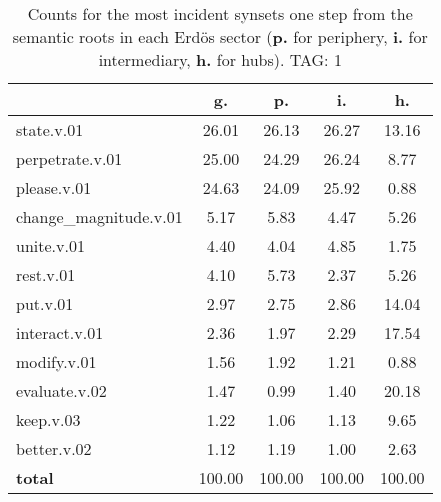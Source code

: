 \begin{table}[h!]
\begin{center}
\begin{tabular}{| l || c | c | c | c |}\hline
 & {\bf g.} & {\bf p.} & {\bf i.} & {\bf h.} \\\hline\hline
state.v.01 & 26.01  & 26.13  & 26.27  & 13.16 \\\hline
perpetrate.v.01 & 25.00  & 24.29  & 26.24  & 8.77 \\\hline
please.v.01 & 24.63  & 24.09  & 25.92  & 0.88 \\\hline
change\_magnitude.v.01 & 5.17  & 5.83  & 4.47  & 5.26 \\\hline
unite.v.01 & 4.40  & 4.04  & 4.85  & 1.75 \\\hline
rest.v.01 & 4.10  & 5.73  & 2.37  & 5.26 \\\hline
put.v.01 & 2.97  & 2.75  & 2.86  & 14.04 \\\hline
interact.v.01 & 2.36  & 1.97  & 2.29  & 17.54 \\\hline
modify.v.01 & 1.56  & 1.92  & 1.21  & 0.88 \\\hline
evaluate.v.02 & 1.47  & 0.99  & 1.40  & 20.18 \\\hline
keep.v.03 & 1.22  & 1.06  & 1.13  & 9.65 \\\hline
better.v.02 & 1.12  & 1.19  & 1.00  & 2.63 \\\hline\hline
{{\bf total}} & 100.00  & 100.00  & 100.00  & 100.00 \\\hline
\end{tabular}
\caption{Counts for the most incident synsets one step from the semantic roots in each Erd\"os sector ({\bf p.} for periphery, {\bf i.} for intermediary, {\bf h.} for hubs). TAG: 1}
\end{center}
\end{table}